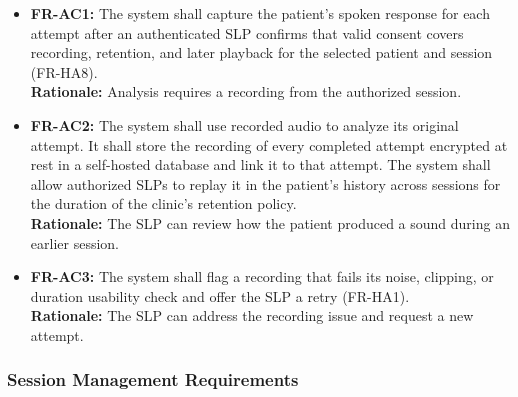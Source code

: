 \documentclass[12pt]{article}
\begin{document}
\noindent\begin{itemize}
\item \textbf{FR-AC1:} The system shall capture the patient's spoken response
for each attempt after an authenticated SLP confirms that valid consent
covers recording, retention, and later playback for the selected patient
and session (FR-HA8). \\
\textbf{Rationale:} Analysis requires a recording from the authorized session.
\item \textbf{FR-AC2:} The system shall use recorded audio to analyze its original attempt. It shall store the recording of every completed attempt encrypted at rest in a self-hosted database and link it to that attempt. The system shall allow authorized SLPs to replay it in the patient's history across sessions for the duration of the clinic's retention policy. \\\textbf{Rationale:} The SLP can review how the patient produced a sound during an earlier session.
\item \textbf{FR-AC3:} The system shall flag a recording that fails its noise, clipping, or duration usability check and offer the SLP a retry (FR-HA1). \\
\textbf{Rationale:} The SLP can address the recording issue and request a new attempt.
\end{itemize}

\subsubsection{Session Management Requirements}
\end{document}
